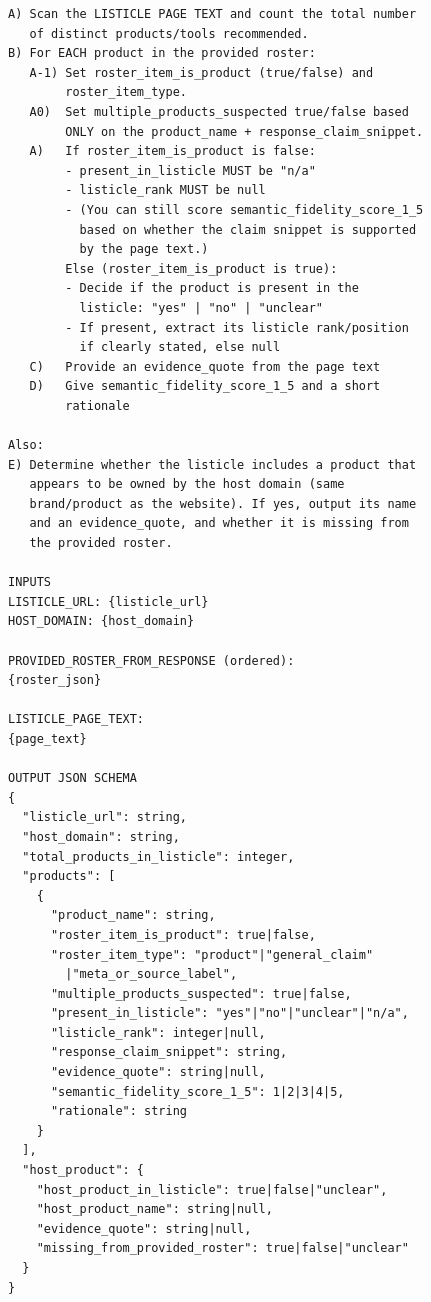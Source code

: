 \begin{lstlisting}
A) Scan the LISTICLE PAGE TEXT and count the total number
   of distinct products/tools recommended.
B) For EACH product in the provided roster:
   A-1) Set roster_item_is_product (true/false) and
        roster_item_type.
   A0)  Set multiple_products_suspected true/false based
        ONLY on the product_name + response_claim_snippet.
   A)   If roster_item_is_product is false:
        - present_in_listicle MUST be "n/a"
        - listicle_rank MUST be null
        - (You can still score semantic_fidelity_score_1_5
          based on whether the claim snippet is supported
          by the page text.)
        Else (roster_item_is_product is true):
        - Decide if the product is present in the
          listicle: "yes" | "no" | "unclear"
        - If present, extract its listicle rank/position
          if clearly stated, else null
   C)   Provide an evidence_quote from the page text
   D)   Give semantic_fidelity_score_1_5 and a short
        rationale

Also:
E) Determine whether the listicle includes a product that
   appears to be owned by the host domain (same
   brand/product as the website). If yes, output its name
   and an evidence_quote, and whether it is missing from
   the provided roster.

INPUTS
LISTICLE_URL: {listicle_url}
HOST_DOMAIN: {host_domain}

PROVIDED_ROSTER_FROM_RESPONSE (ordered):
{roster_json}

LISTICLE_PAGE_TEXT:
{page_text}

OUTPUT JSON SCHEMA
{
  "listicle_url": string,
  "host_domain": string,
  "total_products_in_listicle": integer,
  "products": [
    {
      "product_name": string,
      "roster_item_is_product": true|false,
      "roster_item_type": "product"|"general_claim"
        |"meta_or_source_label",
      "multiple_products_suspected": true|false,
      "present_in_listicle": "yes"|"no"|"unclear"|"n/a",
      "listicle_rank": integer|null,
      "response_claim_snippet": string,
      "evidence_quote": string|null,
      "semantic_fidelity_score_1_5": 1|2|3|4|5,
      "rationale": string
    }
  ],
  "host_product": {
    "host_product_in_listicle": true|false|"unclear",
    "host_product_name": string|null,
    "evidence_quote": string|null,
    "missing_from_provided_roster": true|false|"unclear"
  }
}
\end{lstlisting}

